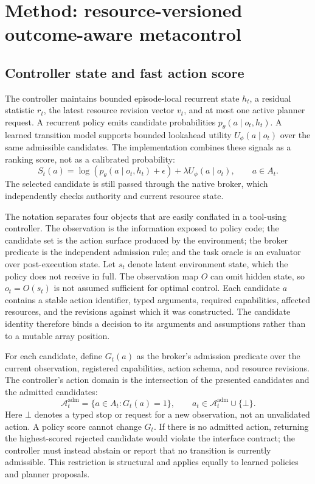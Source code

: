 \documentclass[11pt]{article}
\begin{document}
\section{Method: resource-versioned outcome-aware metacontrol}\label{sec:m12}
\subsection{Controller state and fast action score}
The controller maintains bounded episode-local recurrent state $h_t$, a residual statistic $r_t$, the latest resource revision vector $v_t$, and at most one active planner request. A recurrent policy emits candidate probabilities $p_\theta(a\mid o_t,h_t)$. A learned transition model supports bounded lookahead utility $U_\phi(a\mid o_t)$ over the same admissible candidates. The implementation combines these signals as a ranking score, not as a calibrated probability:
\begin{equation}
S_t(a)=\log(p_\theta(a\mid o_t,h_t)+\epsilon)+\lambda U_\phi(a\mid o_t),\qquad a\in A_t.
\end{equation}
The selected candidate is still passed through the native broker, which independently checks authority and current resource state.

The notation separates four objects that are easily conflated in a tool-using controller. The observation is the information exposed to policy code; the candidate set is the action surface produced by the environment; the broker predicate is the independent admission rule; and the task oracle is an evaluator over post-execution state. Let $s_t$ denote latent environment state, which the policy does not receive in full. The observation map $O$ can omit hidden state, so $o_t=O(s_t)$ is not assumed sufficient for optimal control. Each candidate $a$ contains a stable action identifier, typed arguments, required capabilities, affected resources, and the revisions against which it was constructed. The candidate identity therefore binds a decision to its arguments and assumptions rather than to a mutable array position.

For each candidate, define $G_t(a)$ as the broker's admission predicate over the current observation, registered capabilities, action schema, and resource revisions. The controller's action domain is the intersection of the presented candidates and the admitted candidates:
\begin{equation}
\mathcal{A}^{\mathrm{adm}}_t=\{a\in A_t:G_t(a)=1\},\qquad a_t\in\mathcal{A}^{\mathrm{adm}}_t\cup\{\bot\}.
\end{equation}
Here $\bot$ denotes a typed stop or request for a new observation, not an unvalidated action. A policy score cannot change $G_t$. If there is no admitted action, returning the highest-scored rejected candidate would violate the interface contract; the controller must instead abstain or report that no transition is currently admissible. This restriction is structural and applies equally to learned policies and planner proposals.
\end{document}
